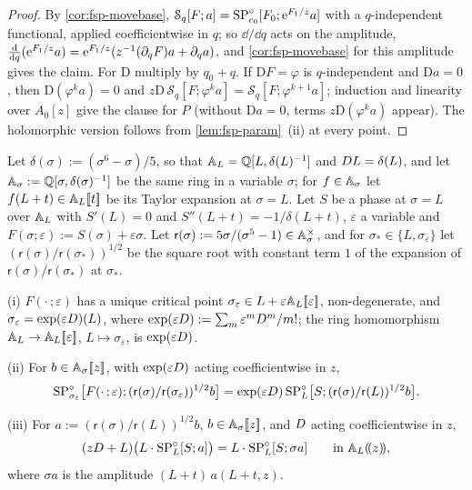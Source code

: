 \begin{proof}
By \cref{cor:fsp-movebase}, $\mathcal S_q[F;a]=\mathrm{SP}^{\circ}_{c_0}[F_0;\mathrm{e}^{F_1/z}a]$ with a $q$-independent functional, applied coefficientwise in $q$; so $\dd/\dd q$ acts on the amplitude, $\frac{\mathrm{d}}{\mathrm{d} q}(\mathrm{e}^{F_1/z}a)=\mathrm{e}^{F_1/z}(z^{-1}(\partial_qF)a+\partial_qa)$, and \cref{cor:fsp-movebase} for this amplitude gives the claim. For $\mathrm D$ multiply by $q_0+q$. If $\mathrm DF=\varphi$ is $q$-independent and $\mathrm Da=0$, then $\mathrm D(\varphi^ka)=0$ and $z\mathrm D\,\mathcal S_q[F;\varphi^ka]=\mathcal S_q[F;\varphi^{k+1}a]$; induction and linearity over $A_0[z]$ give the clause for $P$ (without $\mathrm Da=0$, terms $z\mathrm D(\varphi^ka)$ appear). The holomorphic version follows from \cref{lem:fsp-param}~(ii) at every point.
\end{proof}

\begin{lem}
\label{lem:fsp-generic}
Let $\delta(\sigma):=(\sigma^6-\sigma)/5$, so that $\mathbb{A}_{L}=\mathbb{Q}[L,\delta(L)^{-1}]$ and $D L=\delta(L)$, and let $\mathbb{A}_\sigma:=\mathbb{Q}[\sigma,\delta(\sigma)^{-1}]$ be the same ring in a variable $\sigma$; for $f\in\mathbb{A}_\sigma$ let $f(L+t)\in\mathbb{A}_{L}[\![ t ]\!]$ be its Taylor expansion at $\sigma=L$. Let $S$ be a phase at $\sigma=L$ over $\mathbb{A}_{L}$ with $S'(L)=0$ and $S''(L+t)=-1/\delta(L+t)$, $\varepsilon$ a variable and $F(\sigma;\varepsilon):=S(\sigma)+\varepsilon\sigma$. Let $\mathsf r(\sigma):=5\sigma/(\sigma^5-1)\in\mathbb{A}_\sigma^\times$, and for $\sigma_\ast\in\{L,\sigma_\varepsilon\}$ let $(\mathsf r(\sigma)/\mathsf r(\sigma_\ast))^{1/2}$ be the square root with constant term $1$ of the expansion of $\mathsf r(\sigma)/\mathsf r(\sigma_\ast)$ at $\sigma_\ast$.

(i) $F(\cdot\,;\varepsilon)$ has a unique critical point $\sigma_\varepsilon\in L+\varepsilon\mathbb{A}_{L}[\![ \varepsilon ]\!]$, non-degenerate, and $\sigma_\varepsilon=\exp(\varepsilon D)(L)$, where $\exp(\varepsilon D):=\sum_m\varepsilon^mD^m/m!$; the ring homomorphism $\mathbb{A}_{L}\to\mathbb{A}_{L}[\![ \varepsilon ]\!]$, $L\mapsto\sigma_\varepsilon$, is $\exp(\varepsilon D)$.

(ii) For $b\in\mathbb{A}_\sigma[\![ z ]\!]$, with $\exp(\varepsilon D)$ acting coefficientwise in $z$,
\[
\mathrm{SP}^{\circ}_{\sigma_\varepsilon}\bigl[F(\cdot\,;\varepsilon);(\mathsf r(\sigma)/\mathsf r(\sigma_\varepsilon))^{1/2}b\bigr]=\exp(\varepsilon D)\,\mathrm{SP}^{\circ}_L\bigl[S;(\mathsf r(\sigma)/\mathsf r(L))^{1/2}b\bigr].
\]

(iii) For $a:=(\mathsf r(\sigma)/\mathsf r(L))^{1/2}b$, $b\in\mathbb{A}_\sigma[\![ z ]\!]$, and $D$ acting coefficientwise in $z$,
\begin{equation}
\label{eq:fsp-generic}
(zD+L)\bigl(L\cdot\mathrm{SP}^{\circ}_L[S;a]\bigr)=L\cdot\mathrm{SP}^{\circ}_L[S;\sigma a]\qquad\text{in }\mathbb{A}_{L}(\!(z)\!),
\end{equation}
where $\sigma a$ is the amplitude $(L+t)\,a(L+t,z)$.
\end{lem}

